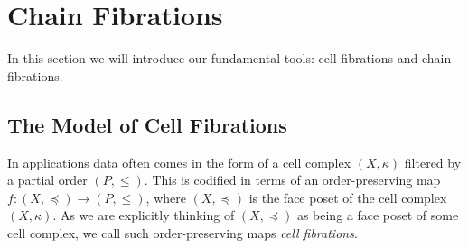 \section{Chain Fibrations}\label{sec:cf}

In this section we will introduce our fundamental tools: cell fibrations and chain fibrations.


\subsection{The Model of Cell Fibrations}

In applications data often comes in the form of a cell complex $(X,\kappa)$ filtered by a partial order $(P,\leq)$.  This is codified in terms of an order-preserving map $f:(X,\preceq)\to (P,\leq)$, where $(X,\preceq)$ is the face poset of the cell complex $(X,\kappa)$. As we are explicitly thinking of $(X,\preceq)$ as being a face poset of some cell complex, we call such order-preserving maps {\em cell fibrations}.



%
%
%
%
%
%


